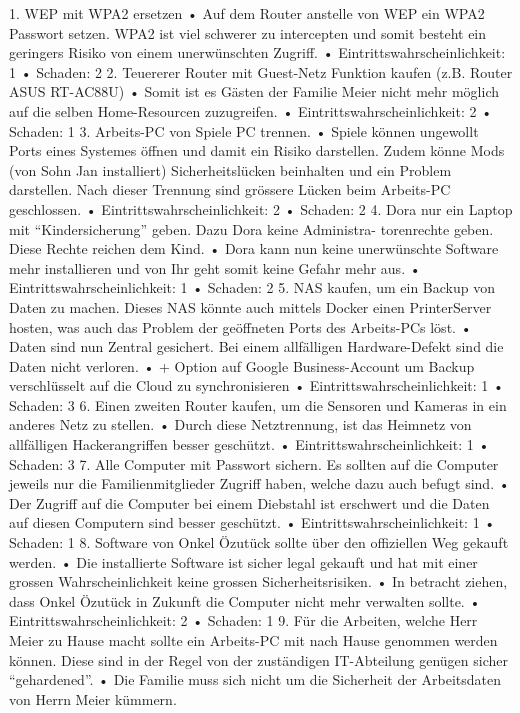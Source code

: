 \documentclass{article}
\begin{document}
\begin{landscape}
1. WEP mit WPA2 ersetzen
• Auf dem Router anstelle von WEP ein WPA2 Passwort setzen. WPA2 ist
viel schwerer zu intercepten und somit besteht ein geringers Risiko von einem
unerwünschten Zugriff.
• Eintrittswahrscheinlichkeit: 1
• Schaden: 2
2. Teuererer Router mit Guest-Netz Funktion kaufen (z.B. Router ASUS RT-AC88U)
• Somit ist es Gästen der Familie Meier nicht mehr möglich auf die selben
Home-Resourcen zuzugreifen.
• Eintrittswahrscheinlichkeit: 2
• Schaden: 1
3. Arbeits-PC von Spiele PC trennen.
• Spiele können ungewollt Ports eines Systemes öffnen und damit ein Risiko
darstellen. Zudem könne Mods (von Sohn Jan installiert) Sicherheitslücken
beinhalten und ein Problem darstellen. Nach dieser Trennung sind grössere
Lücken beim Arbeits-PC geschlossen.
• Eintrittswahrscheinlichkeit: 2
• Schaden: 2
4. Dora nur ein Laptop mit “Kindersicherung” geben. Dazu Dora keine Administra-
torenrechte geben. Diese Rechte reichen dem Kind.
• Dora kann nun keine unerwünschte Software mehr installieren und von Ihr
geht somit keine Gefahr mehr aus.
• Eintrittswahrscheinlichkeit: 1
• Schaden: 2
5. NAS kaufen, um ein Backup von Daten zu machen. Dieses NAS könnte auch
mittels Docker einen PrinterServer hosten, was auch das Problem der geöffneten
Ports des Arbeits-PCs löst.
• Daten sind nun Zentral gesichert. Bei einem allfälligen Hardware-Defekt sind
die Daten nicht verloren.
• + Option auf Google Business-Account um Backup verschlüsselt auf die Cloud
zu synchronisieren
• Eintrittswahrscheinlichkeit: 1
• Schaden: 3
6. Einen zweiten Router kaufen, um die Sensoren und Kameras in ein anderes Netz
zu stellen.
• Durch diese Netztrennung, ist das Heimnetz von allfälligen Hackerangriffen
besser geschützt.
• Eintrittswahrscheinlichkeit: 1
• Schaden: 3
7. Alle Computer mit Passwort sichern. Es sollten auf die Computer jeweils nur die
Familienmitglieder Zugriff haben, welche dazu auch befugt sind.
• Der Zugriff auf die Computer bei einem Diebstahl ist erschwert und die Daten
auf diesen Computern sind besser geschützt.
• Eintrittswahrscheinlichkeit: 1
• Schaden: 1
8. Software von Onkel Özutück sollte über den offiziellen Weg gekauft werden.
• Die installierte Software ist sicher legal gekauft und hat mit einer grossen
Wahrscheinlichkeit keine grossen Sicherheitsrisiken.
• In betracht ziehen, dass Onkel Özutück in Zukunft die Computer nicht mehr
verwalten sollte.
• Eintrittswahrscheinlichkeit: 2
• Schaden: 1
9. Für die Arbeiten, welche Herr Meier zu Hause macht sollte ein Arbeits-PC mit
nach Hause genommen werden können. Diese sind in der Regel von der zuständigen
IT-Abteilung genügen sicher “gehardened”.
• Die Familie muss sich nicht um die Sicherheit der Arbeitsdaten von Herrn
Meier kümmern.


\end{landscape}
\end{document}
